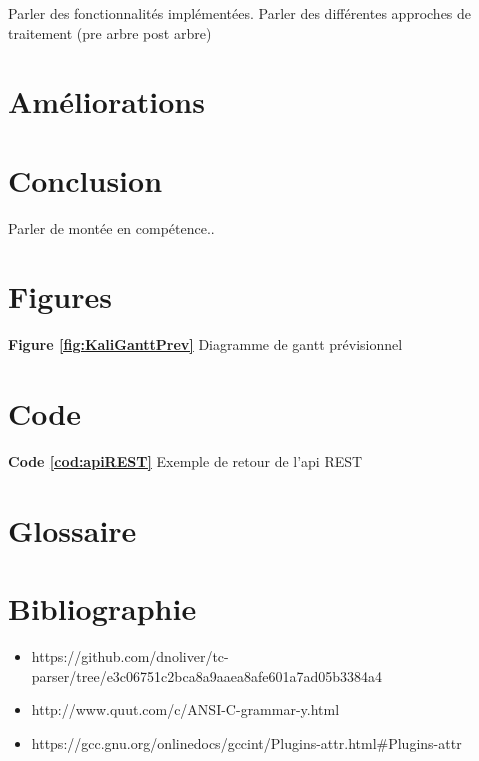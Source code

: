 \documentclass{article}
\begin{document}
	\newpage


Parler des fonctionnalités implémentées.
	Parler des différentes approches de traitement (pre arbre post arbre)
	
	
	
	\section{Améliorations}
	
	\section{Conclusion}
	
	Parler de montée en compétence..
	
	
	\section*{Figures}
\indent
\textbf{Figure \ref{fig:KaliGanttPrev}} Diagramme de gantt prévisionnel\\
\indent

\section*{Code}

\indent
\textbf{Code \ref{cod:apiREST}} Exemple de retour de l'api REST\\
\indent

    


\section*{Glossaire}
\renewcommand{\glossarysection}[2][]{}

\printglossary[title=List of Terms,toctitle=Terms and abbreviations]



\section*{Bibliographie}
\begin{itemize}

\item https://github.com/dnoliver/tc-parser/tree/e3c06751c2bca8a9aaea8afe601a7ad05b3384a4
\item http://www.quut.com/c/ANSI-C-grammar-y.html
\item https://gcc.gnu.org/onlinedocs/gccint/Plugins-attr.html\#Plugins-attr

\end{itemize}
	
\end{document}

